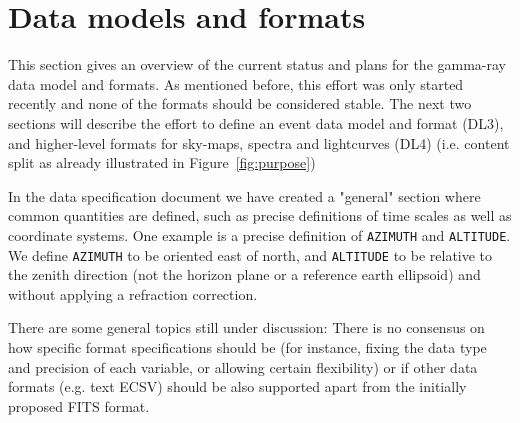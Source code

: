\section{Data models and formats}

This section gives an overview of the current status and plans for the gamma-ray data model and formats. As mentioned before, this effort was only started recently and none of the formats should be considered stable. The next two sections will describe the effort to define an event data model and format (DL3), and higher-level formats for sky-maps, spectra and lightcurves (DL4) (i.e. content split as already illustrated in Figure~\ref{fig:purpose})

In the data specification document we have created a "general" section where common quantities are defined, such as precise definitions of time scales as well as coordinate systems. One example is a precise definition of \texttt{AZIMUTH} and \texttt{ALTITUDE}. We define \texttt{AZIMUTH} to be oriented east of north, and \texttt{ALTITUDE} to be relative to the zenith direction (not the horizon plane or a reference earth ellipsoid) and without applying a refraction correction.

There are some general topics still under discussion: There is no consensus on how specific format specifications should be (for instance, fixing the data type and precision of each variable, or allowing certain flexibility) or if other data formats (e.g. text ECSV) should be also supported apart from the initially proposed FITS format.




